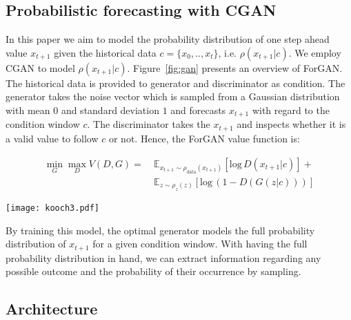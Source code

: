 \documentclass{ieeeaccess}
\begin{document}
\subsection{Probabilistic forecasting with CGAN}

In this paper we aim to model the probability distribution of one step ahead value $x_{t+1}$ given the historical data $c=\{x_0,.., x_t\}$, i.e. $\rho(x_{t+1}|c)$. We employ CGAN to model $\rho(x_{t+1}|c)$. Figure~\ref{fig:gan} presents an overview of ForGAN. The historical data is provided to generator and discriminator as condition. The generator takes the noise vector which is sampled from a Gaussian distribution with mean $0$ and standard deviation $1$ and forecasts $x_{t+1}$ with regard to the condition window $c$. The discriminator takes the $x_{t+1}$ and inspects whether it is a valid value to follow $c$ or not. Hence, the ForGAN value function is:

\begin{equation*}
\begin{aligned}
\min_{G} \max_{D} V(D,G) = \ &\mathbb{E}_{x_{t+1}\sim\rho_\text{data}(x_{t+1})}[\text{log}\, D(x_{t+1}|c)] +\\ &\mathbb{E}_{z\sim\rho_{z}(z)}[\text{log}\,(1-D(G(z|c)))]
\label{eq:lose_forgan}
\end{aligned}
\end{equation*}

\begin{figure*}
	\centering
	\texttt{[image: kooch3.pdf]}
	\caption{Overview of proposed ForGAN architecture. The condition $c$ is handed to generator $G$ and discriminator $D$.  }
	\label{fig:gan}
\end{figure*}

By training this model, the optimal generator models the full probability distribution of $x_{t+1}$ for a given condition window. With having the full probability distribution in hand, we can extract information regarding any possible outcome and the probability of their occurrence by sampling.

\subsection{Architecture}
\end{document}
